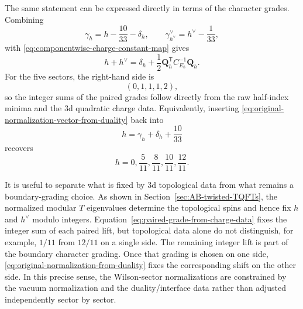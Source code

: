 \documentclass[11pt,a4paper]{article}
\numberwithin{equation}{section}
\begin{document}
The same statement can be expressed directly in terms of the character grades.  Combining
\begin{equation}
  \gamma_h=h-\frac{10}{33}-\delta_h,
  \qquad
  \gamma_{h^\vee}^\vee=h^\vee-\frac1{33},
\end{equation}
with \eqref{eq:componentwise-charge-constant-map} gives
\begin{equation}
  h+h^\vee
  =\delta_h
  +\frac12\boldsymbol Q_h^{\mathsf T}C_{E_8}^{-1}\boldsymbol Q_h.
  \label{eq:paired-grade-from-charge-data}
\end{equation}
For the five sectors, the right-hand side is
\begin{equation}
  (0,1,1,1,2),
  \label{eq:paired-grade-integers-from-charge-data}
\end{equation}
so the integer sums of the paired grades follow directly from the raw half-index minima and the 3d quadratic charge data.  Equivalently, inserting \eqref{eq:original-normalization-vector-from-duality} back into
\begin{equation}
  h=\gamma_h+\delta_h+\frac{10}{33}
  \label{eq:original-grade-from-normalization}
\end{equation}
recovers
\begin{equation}
  h=0,\frac5{11},\frac8{11},\frac{10}{11},\frac{12}{11}.
  \label{eq:original-grades-recovered}
\end{equation}

It is useful to separate what is fixed by 3d topological data from what remains a boundary-grading choice.  As shown in Section~\ref{sec:AB-twisted-TQFTs}, the normalized modular $T$ eigenvalues determine the topological spins and hence fix $h$ and $h^\vee$ modulo integers.  Equation~\eqref{eq:paired-grade-from-charge-data} fixes the integer sum of each paired lift, but topological data alone do not distinguish, for example, $1/11$ from $12/11$ on a single side.  The remaining integer lift is part of the boundary character grading.  Once that grading is chosen on one side, \eqref{eq:original-normalization-from-duality} fixes the corresponding shift on the other side.  In this precise sense, the Wilson-sector normalizations are constrained by the vacuum normalization and the duality/interface data rather than adjusted independently sector by sector.
\end{document}
